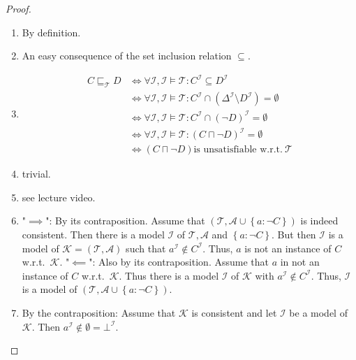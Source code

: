 \begin{proof}
	\begin{enumerate}
		\item By definition.
		\item An easy consequence of the set inclusion relation $\subseteq$.
		\item
			\begin{align*}
				C \sqsubseteq_{\mathcal{T}} D & \iff \forall \mathcal{I}, \mathcal{I} \vDash \mathcal{T}: C^{\mathcal{I}} \subseteq D^{\mathcal{I}}\\
											  & \iff \forall \mathcal{I}, \mathcal{I} \vDash \mathcal{T} : C^\mathcal{I} \cap (\Delta^{\mathcal{I}} \setminus D^{\mathcal{I}}) = \emptyset\\
											  & \iff \forall \mathcal{I}, \mathcal{I} \vDash \mathcal{T}: C^{\mathcal{I}} \cap (\neg D)^\mathcal{I} = \emptyset\\
											  & \iff \forall \mathcal{I}, \mathcal{I} \vDash \mathcal{T}: \left( C \sqcap \neg D \right)^\mathcal{I} = \emptyset\\
											  & \iff \left( C \sqcap \neg D \right) \text{is unsatisfiable w.r.t.}\ \mathcal{T} 
			\end{align*}
		\item trivial.
		\item see lecture video.
		\item "$ \implies$": By its contraposition. \newline
			Assume that $\left( \mathcal{T}, \mathcal{A} \cup \left\{a: \neg C \right\} \right)$ is indeed consistent.
			Then there is  a model $\mathcal{I}$ of $\mathcal{T} , \mathcal{A}$ and $\left\{ a: \neg C \right\}$.
			But then $\mathcal{I}$ is a model of $\mathcal{K} = \left( \mathcal{T}, \mathcal{A} \right)$ such that
			$a^{\mathcal{I}} \notin C^\mathcal{I}$.
			Thus, $a$ is not an instance of $C$ w.r.t.\ $\mathcal{K}$. \newline
			"$\impliedby$": Also by its contraposition. \newline
			Assume that $a$ in not an instance of $C$ w.r.t.\ $\mathcal{K}$.
			Thus there is a model $\mathcal{I}$ of $\mathcal{K}$ with $a^\mathcal{I} \notin C^\mathcal{I}$.
			Thus, $\mathcal{I}$ is a model of $\left( \mathcal{T}, \mathcal{A} \cup \left\{ a: \neg C \right\} \right)$.
		\item By the contraposition: \newline
			Assume that $\mathcal{K}$ is consistent and let $\mathcal{I}$ be a model of $\mathcal{K}$.
			Then $a^\mathcal{I} \notin \emptyset = \bot^\mathcal{I}$.

\end{enumerate}
\end{proof}
